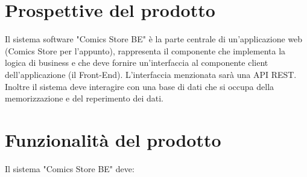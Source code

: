 \documentclass{scrreprt}
\begin{document}
\section{Prospettive del prodotto}
Il sistema software "Comics Store BE" è la parte centrale di un'applicazione web (Comics Store per l'appunto),
rappresenta il componente che implementa la logica di business e che deve fornire un'interfaccia al componente client
dell'applicazione (il Front-End). L'interfaccia menzionata sarà una API REST.
Inoltre il sistema deve interagire con una base di dati che si occupa della memorizzazione e del reperimento dei dati.

\section{Funzionalità del prodotto}
Il sistema "Comics Store BE" deve:
\end{document}
